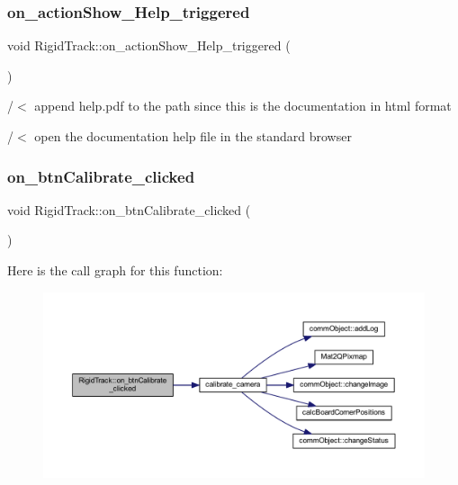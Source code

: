 \mbox{\label{class_rigid_track_af14465ac3ad6957b939c63cbae2d7d8c}} 
\subsubsection{on\+\_\+action\+Show\+\_\+\+Help\+\_\+triggered}
{\footnotesize\ttfamily void Rigid\+Track\+::on\+\_\+action\+Show\+\_\+\+Help\+\_\+triggered (\begin{DoxyParamCaption}{ }\end{DoxyParamCaption})\hspace{0.3cm}{\ttfamily [slot]}}

/$<$ append help.\+pdf to the path since this is the documentation in html format

/$<$ open the documentation help file in the standard browser \mbox{\label{class_rigid_track_aed2c39da404909142074f7dd2ce75a63}} 
\subsubsection{on\+\_\+btn\+Calibrate\+\_\+clicked}
{\footnotesize\ttfamily void Rigid\+Track\+::on\+\_\+btn\+Calibrate\+\_\+clicked (\begin{DoxyParamCaption}{ }\end{DoxyParamCaption})\hspace{0.3cm}{\ttfamily [slot]}}

Here is the call graph for this function\+:\nopagebreak
\begin{figure}[H]
\begin{center}
\leavevmode
\includegraphics[width=350pt]{class_rigid_track_aed2c39da404909142074f7dd2ce75a63_cgraph}
\end{center}
\end{figure}
\mbox{\label{class_rigid_track_a9a939d6db3d268e75a603cb3d492a91b}} 
